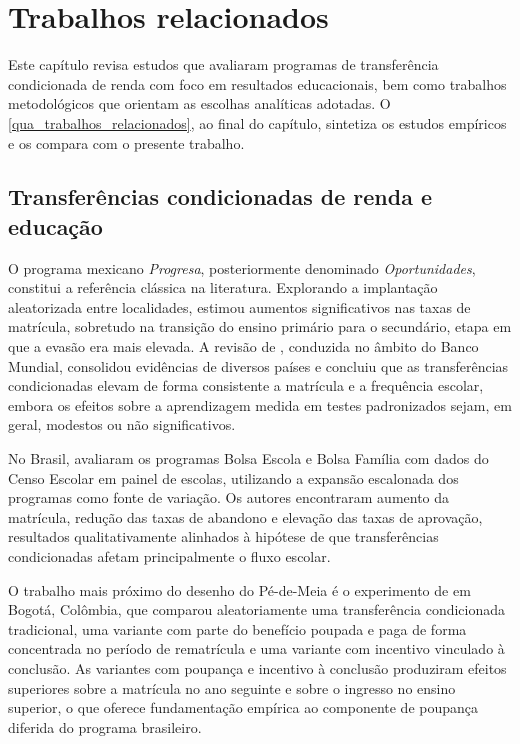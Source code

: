 
\chapter{Trabalhos relacionados}
\label{chap_trabalhos_relacionados}

Este capítulo revisa estudos que avaliaram programas de transferência condicionada de renda com foco em resultados educacionais, bem como trabalhos metodológicos que orientam as escolhas analíticas adotadas.
O \autoref{qua_trabalhos_relacionados}, ao final do capítulo, sintetiza os estudos empíricos e os compara com o presente trabalho.

\section{Transferências condicionadas de renda e educação}
\label{sec_tcr_educacao}

O programa mexicano \textit{Progresa}, posteriormente denominado \textit{Oportunidades}, constitui a referência clássica na literatura.
Explorando a implantação aleatorizada entre localidades,  estimou aumentos significativos nas taxas de matrícula, sobretudo na transição do ensino primário para o secundário, etapa em que a evasão era mais elevada.
A revisão de , conduzida no âmbito do Banco Mundial, consolidou evidências de diversos países e concluiu que as transferências condicionadas elevam de forma consistente a matrícula e a frequência escolar, embora os efeitos sobre a aprendizagem medida em testes padronizados sejam, em geral, modestos ou não significativos.

No Brasil,  avaliaram os programas Bolsa Escola e Bolsa Família com dados do Censo Escolar em painel de escolas, utilizando a expansão escalonada dos programas como fonte de variação.
Os autores encontraram aumento da matrícula, redução das taxas de abandono e elevação das taxas de aprovação, resultados qualitativamente alinhados à hipótese de que transferências condicionadas afetam principalmente o fluxo escolar.

O trabalho mais próximo do desenho do Pé-de-Meia é o experimento de  em Bogotá, Colômbia, que comparou aleatoriamente uma transferência condicionada tradicional, uma variante com parte do benefício poupada e paga de forma concentrada no período de rematrícula e uma variante com incentivo vinculado à conclusão.
As variantes com poupança e incentivo à conclusão produziram efeitos superiores sobre a matrícula no ano seguinte e sobre o ingresso no ensino superior, o que oferece fundamentação empírica ao componente de poupança diferida do programa brasileiro.

